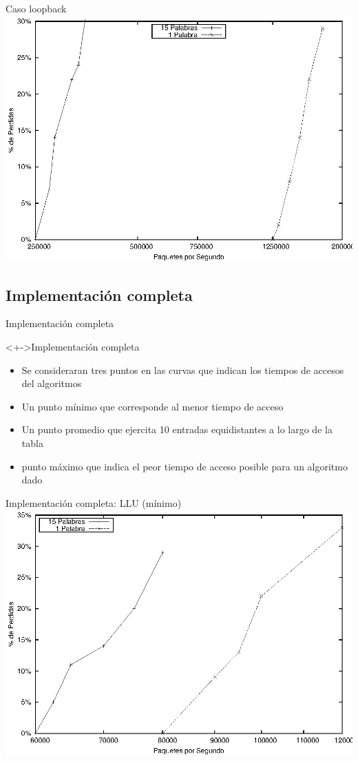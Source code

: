 \documentclass[xcolor=dvipsnames]{beamer}
\begin{document}
\begin{frame}{Caso loopback} 
\center	
\includegraphics[scale=0.70]{figures/loop.eps} 
\end{frame}

\subsection{Implementación completa}
\begin{frame}{Implementación completa} 
 \begin{block}<+->{Implementación completa}   
    \begin{itemize}
      \scriptsize
     	\item Se consideraran tres puntos en las curvas que indican los tiempos de accesos del algoritmos
     	\item Un punto mínimo que corresponde al menor tiempo de acceso
	\item Un punto promedio que ejercita 10 entradas equidistantes a lo largo de la tabla
	\item punto máximo que indica el peor tiempo de acceso posible para un algoritmo dado	
    \end{itemize}
  \end{block}
\end{frame}

\begin{frame}{Implementación completa: LLU (mínimo)} 
\center	
\includegraphics[scale=0.70]{figures/llumin.eps} 
\end{frame}
\end{document}
